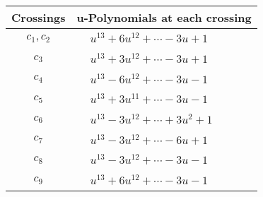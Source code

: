 \documentclass[1p]{elsarticle_modified}
\theoremstyle{definition}
\begin{document}
\begin{tabular}{m{50pt}|m{274pt}}
Crossings & \hspace{64pt}u-Polynomials at each crossing \\
\hline $$\begin{aligned}c_{1},c_{2}\end{aligned}$$&$\begin{aligned}
&u^{13}+6 u^{12}+\cdots-3 u+1
\end{aligned}$\\
\hline $$\begin{aligned}c_{3}\end{aligned}$$&$\begin{aligned}
&u^{13}+3 u^{12}+\cdots-3 u+1
\end{aligned}$\\
\hline $$\begin{aligned}c_{4}\end{aligned}$$&$\begin{aligned}
&u^{13}-6 u^{12}+\cdots-3 u-1
\end{aligned}$\\
\hline $$\begin{aligned}c_{5}\end{aligned}$$&$\begin{aligned}
&u^{13}+3 u^{11}+\cdots-3 u-1
\end{aligned}$\\
\hline $$\begin{aligned}c_{6}\end{aligned}$$&$\begin{aligned}
&u^{13}-3 u^{12}+\cdots+3 u^2+1
\end{aligned}$\\
\hline $$\begin{aligned}c_{7}\end{aligned}$$&$\begin{aligned}
&u^{13}-3 u^{12}+\cdots-6 u+1
\end{aligned}$\\
\hline $$\begin{aligned}c_{8}\end{aligned}$$&$\begin{aligned}
&u^{13}-3 u^{12}+\cdots-3 u-1
\end{aligned}$\\
\hline $$\begin{aligned}c_{9}\end{aligned}$$&$\begin{aligned}
&u^{13}+6 u^{12}+\cdots-3 u-1
\end{aligned}$\\

\end{tabular}
\end{document}
